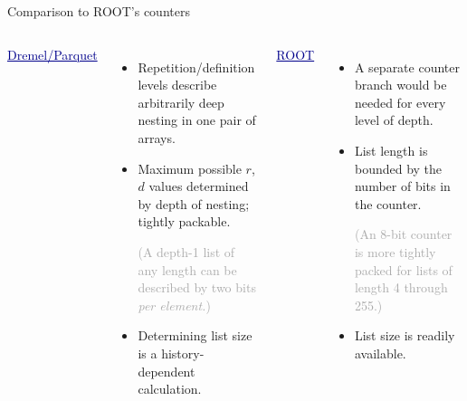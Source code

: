 \documentclass{beamer}
\begin{document}
\begin{frame}{Comparison to ROOT's counters}
\vspace{0.5 cm}
\begin{columns}[t]
\textcolor{darkblue}{\underline{\large Dremel/Parquet}}

\begin{itemize}
\item Repetition/definition levels describe arbitrarily deep nesting in one pair of arrays.

\item Maximum possible $r$, $d$ values determined by depth of nesting; tightly packable.

\textcolor{darkgrey}{(A depth-1 list of any length can be described by two bits {\it per element.})}

\item Determining list size is a history-dependent calculation.

\end{itemize}

\textcolor{darkblue}{\underline{\large ROOT}}

\begin{itemize}
\item A separate counter branch would be needed for every level of depth.

\item List length is bounded by the number of bits in the counter.

\textcolor{darkgrey}{(An 8-bit counter is more tightly packed for lists of length 4 through 255.)}

\item List size is readily available.
\end{itemize}
\end{columns}
\end{frame}
\end{document}
